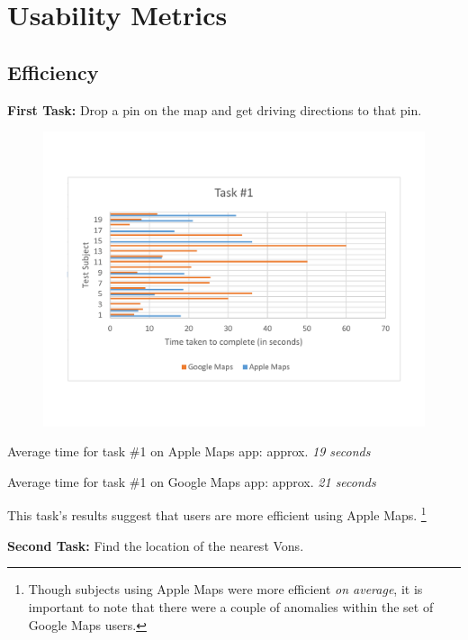 \documentclass[a4paper; 11pt]{article}
\begin{document}
\section{Usability Metrics}
\subsection{Efficiency}
\par
\textbf{First Task: }Drop a pin on the map and get driving directions to that pin.
\vspace{-.4in}
\begin{figure}[ht]
\begin{center}
\vspace{-.1in}
\includegraphics[keepaspectratio, width=.8\textwidth ]{task1.pdf}
\end{center}
\end{figure}
\begin{center}
\vspace{-.6in}
\par
Average time for task \#1 on Apple Maps app: approx. \textit{19 seconds}
\par
Average time for task \#1 on Google Maps app: approx. \textit{21 seconds}
\end{center}
\par
\noindent
This task's results suggest that users are more efficient using Apple Maps. \footnote{Though subjects using Apple Maps were more efficient \textit{on average}, it is important to note that there were a couple of anomalies within the set of Google Maps users.}
\medskip
\medskip
\par
\noindent
\textbf{Second Task: }Find the location of the nearest Vons.
\end{document}
